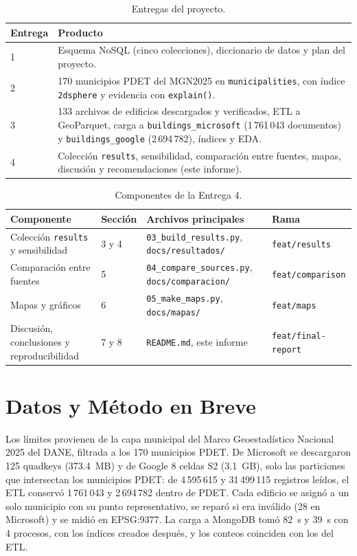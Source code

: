 \documentclass[12pt, letterpaper]{article}
\begin{document}
\begin{table}[H]
\centering
\small
{}
\begin{tabularx}{\textwidth}{l X}
\toprule
\textbf{Entrega} & \textbf{Producto} \\
\midrule
1 & Esquema NoSQL (cinco colecciones), diccionario de datos y plan del proyecto. \\
2 & 170 municipios PDET del MGN2025 en \texttt{municipalities}, con índice \texttt{2dsphere} y evidencia con \texttt{explain()}. \\
3 & 133 archivos de edificios descargados y verificados, ETL a GeoParquet, carga a \texttt{buildings\_microsoft} (1\,761\,043 documentos) y \texttt{buildings\_google} (2\,694\,782), índices y EDA. \\
4 & Colección \texttt{results}, sensibilidad, comparación entre fuentes, mapas, discusión y recomendaciones (este informe). \\
\bottomrule
\end{tabularx}
\caption{Entregas del proyecto.}
\label{tab:entregas}
\end{table}

\begin{table}[H]
\centering
\small
{}
\begin{tabularx}{\textwidth}{Y{0.28} Y{0.10} Y{0.37} Y{0.25}}
\toprule
\textbf{Componente} & \textbf{Sección} & \textbf{Archivos principales} & \textbf{Rama} \\
\midrule
Colección \texttt{results} y sensibilidad & 3 y 4 & \texttt{03\_build\_results.py}, \texttt{docs/resultados/} & \texttt{feat/results} \\
Comparación entre fuentes & 5 & \texttt{04\_compare\_sources.py}, \texttt{docs/comparacion/} & \texttt{feat/comparison} \\
Mapas y gráficos & 6 & \texttt{05\_make\_maps.py}, \texttt{docs/mapas/} & \texttt{feat/maps} \\
Discusión, conclusiones y reproducibilidad & 7 y 8 & \texttt{README.md}, este informe & \texttt{feat/final-report} \\
\bottomrule
\end{tabularx}
\caption{Componentes de la Entrega 4.}
\label{tab:criterios4}
\end{table}

\section{Datos y Método en Breve}
Los límites provienen de la capa municipal del Marco Geoestadístico Nacional 2025 del DANE, filtrada a los 170 municipios PDET. De Microsoft se descargaron 125 quadkeys (373.4~MB) y de Google 8 celdas S2 (3.1~GB), solo las particiones que intersectan los municipios PDET: de 4\,595\,615 y 31\,499\,115 registros leídos, el ETL conservó 1\,761\,043 y 2\,694\,782 dentro de PDET. Cada edificio se asignó a un solo municipio con su punto representativo, se reparó si era inválido (28 en Microsoft) y se midió en EPSG:9377. La carga a MongoDB tomó 82~s y 39~s con 4 procesos, con los índices creados después, y los conteos coinciden con los del ETL.
\end{document}
